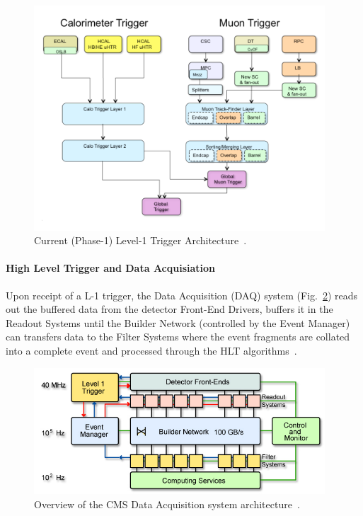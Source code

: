 \begin{figure}[htbp]
\begin{center}
\includegraphics[width=0.97\textwidth]{figs/cms/TrigUpgradeBlockDiagram.pdf}
\caption{Current (Phase-1) Level-1 Trigger Architecture~\cite{Tapper:2013yva}.}
\label{fig:trigger}
\end{center}
\end{figure}

\paragraph{High Level Trigger and Data Acquisiation}\label{paragraph:HLT}
Upon receipt of a L-1 trigger, the Data Acquisition (DAQ) system (Fig.~\ref{fig:DAQ}) reads out the buffered data from the detector Front-End Drivers, buffers it in the Readout Systems until the Builder Network (controlled by the Event Manager) can transfers data to the Filter Systems where the event fragments are collated into a complete event and processed through the HLT algorithms~\cite{Sphicas:2002gg}. 

\begin{figure}[htbp]
\begin{center}
\includegraphics[width=0.97\textwidth]{figs/cms/CMS_DAQ.jpg}
\caption{Overview of the CMS Data Acquisition system architecture~\cite{Sphicas:2002gg}.}
\label{fig:DAQ}
\end{center}
\end{figure}

